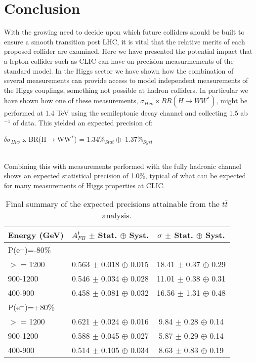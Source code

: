 \chapter{Conclusion}

With the growing need to decide upon which future colliders should be built to ensure a smooth transition post LHC, it is vital that the relative merits of each proposed collider are examined. Here we have presented the potential impact that a lepton collider such as \ac{CLIC} can have on precision measurmements of the standard model. In the Higgs sector we have shown how the combination of several measurements can provide access to model independent measurements of the Higgs couplings, something not possible at hadron colliders. In particular we have shown how one of these measurements, $\sigma_{H\nu\bar{\nu}} \times BR(H\rightarrow WW^*)$, might be performed at 1.4 TeV using the semileptonic decay channel and collecting 1.5 ab$^{-1}$ of data. This yielded an expected precision of: \\[10pt]\centerline{\large{$\delta\sigma_{H\nu\nu}$ x BR(H$\rightarrow$WW$^*$) = 1.34\%$_{Stat} \oplus$ 1.37\%$_{Syst}$}} \\[10pt] Combining this with measurements performed with the fully hadronic channel shows an expected statistical precision of 1.0\%, typical of what can be expected for many measurements of Higgs properties at \ac{CLIC}.

\begin{table}[t]
  \centering
  \begin{tabular}{l|c|c}
    \toprule
    Energy (GeV) & $A_{FB}^t$ $\pm$ Stat. $\oplus$ Syst. & $\sigma$  $\pm$ Stat. $\oplus$ Syst.   \\
    \midrule
    \midrule
    \multicolumn{3}{l}{ P(e$^-$)=-80\%}\\
    \midrule
    $>=$1200   & 0.563 $\pm$ 0.018 $\oplus$ 0.015 & 18.41 $\pm$ 0.37 $\oplus$ 0.29\\
    \midrule
    900-1200   & 0.546 $\pm$ 0.034 $\oplus$ 0.028 & 11.01 $\pm$ 0.38 $\oplus$ 0.31\\
    \midrule
    400-900    & 0.458 $\pm$ 0.081 $\oplus$ 0.032 & 16.56 $\pm$ 1.31 $\oplus$ 0.48\\
    \midrule
    \midrule
    \multicolumn{3}{l}{ P(e$^-$)=+80\%}\\
    \midrule
    $>=$1200  & 0.621 $\pm$ 0.024 $\oplus$ 0.016 & 9.84 $\pm$ 0.28 $\oplus$ 0.14\\
    \midrule
    900-1200  & 0.588 $\pm$ 0.045 $\oplus$ 0.027 & 5.87 $\pm$ 0.29 $\oplus$ 0.14\\
    \midrule
    400-900   & 0.514 $\pm$ 0.105 $\oplus$ 0.034 & 8.63 $\pm$ 0.83 $\oplus$ 0.19\\
    \bottomrule
  \end{tabular}
  \caption{Final summary of the expected precisions attainable from the $t\bar{t}$ analysis.}
  \label{conlusiontable}
\end{table}

